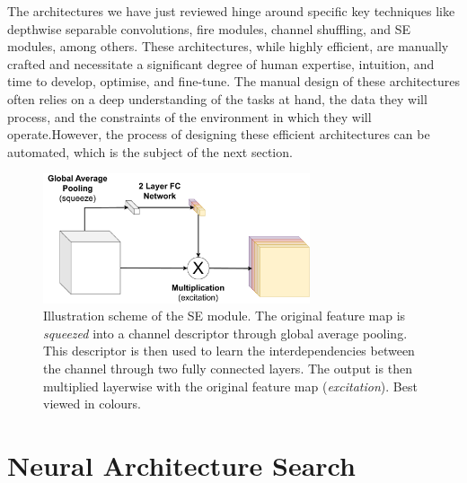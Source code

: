 
The architectures we have just reviewed hinge around specific key techniques
like depthwise separable convolutions, fire modules, channel shuffling, and
\ac{SE} modules, among others. These architectures, while
highly efficient, are manually crafted and necessitate a significant degree of
human expertise, intuition, and time to develop, optimise, and fine-tune. The
manual design of these architectures often relies on a deep understanding of the
tasks at hand, the data they will process, and the constraints of the
environment in which they will operate.However, the process of designing these efficient architectures can be
automated, which is the subject of the next section.\\


\begin{figure}[htbp]
    \centering
    \includegraphics[width=0.70\textwidth]{chapter_sota/assets/SE_module.pdf}
    \caption{Illustration scheme of the \acf{SE} module. The original feature
    map is \emph{squeezed} into a channel descriptor through global average
    pooling. This descriptor is then used to learn the interdependencies between
    the channel through two fully connected layers. The output is then
    multiplied layerwise with the original feature map (\emph{excitation}). Best
    viewed in colours.}
    \label{fig:sota:se_module}
\end{figure}


\section{Neural Architecture Search}\label{sec:sota:nas} 

